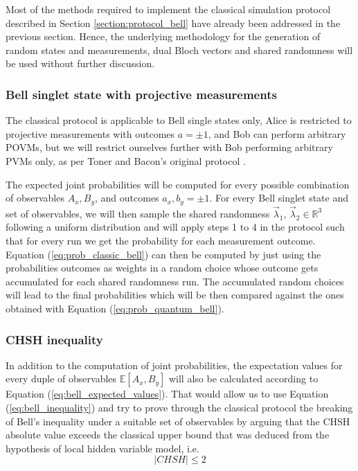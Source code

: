 Most of the methods required to implement the classical simulation protocol described in Section \ref{section:protocol_bell} have already been addressed in the previous section. Hence, the underlying methodology for the generation of random states and measurements, dual Bloch vectors and shared randomness will be used without further discussion.

\subsubsection{Bell singlet state with projective measurements}

The classical protocol is applicable to Bell single states only, Alice is restricted to projective measurements with outcomes $a=\pm1$, and Bob can perform arbitrary POVMs, but we will restrict ourselves further with Bob performing arbitrary PVMs only, as per Toner and Bacon's original protocol \cite{toner2003}.

The expected joint probabilities will be computed for every possible combination of observables $A_{x}, B_{y}$, and outcomes $a_{x}, b_{y} = \pm1$. For every Bell singlet state and set of observables, we will then sample the shared randomness $\vec{\lambda}_1$, $\vec{\lambda}_2 \in \mathbb{R}^3$ following a uniform distribution and will apply steps 1 to 4 in the protocol such that for every run we get the probability for each measurement outcome. Equation (\ref{eq:prob_classic_bell}) can then be computed by just using the probabilities outcomes as weights in a random choice whose outcome gets accumulated for each shared randomness run. The accumulated random choices will lead to the final probabilities which will be then compared against the ones obtained with Equation (\ref{eq:prob_quantum_bell}).

\subsubsection{CHSH inequality}
In addition to the computation of joint probabilities, the expectation values for every duple of observables $\mathbb{E}[A_{x}, B_{y}]$ will also be calculated according to Equation (\ref{eq:bell_expected_values}). That would allow us to use Equation (\ref{eq:bell_inequality}) and try to prove through the classical protocol the breaking of Bell's inequality under a suitable set of observables by arguing that the CHSH absolute value exceeds the classical upper bound that was deduced from the hypothesis of local hidden variable model, i.e.
\begin{equation}\label{eq:chsh_inequality}
|\mathit{CHSH}| \leq 2
\end{equation}